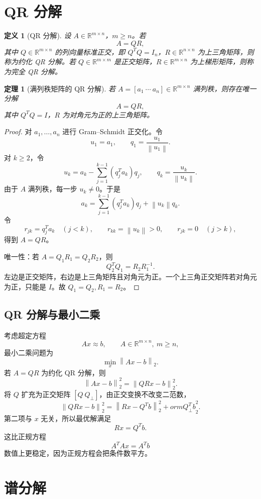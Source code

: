 \documentclass[UTF8,openany,zihao=-4]{ctexbook}
\theoremstyle{cnplain}
\newtheorem{definition}{定义}[chapter]
\newtheorem{theorem}{定理}[chapter]
\newcommand{\R}{\mathbb R}
\newcommand{\norm}[1]{\left\lVert #1\right\rVert}
\begin{document}
\section{QR 分解}

\begin{definition}[QR 分解]
设 $A\in\R^{m\times n}$，$m\ge n$。若
\[
A=QR,
\]
其中 $Q\in\R^{m\times n}$ 的列向量标准正交，即 $Q^TQ=I_n$，$R\in\R^{n\times n}$ 为上三角矩阵，则称为约化 QR 分解。若 $Q\in\R^{m\times m}$ 是正交矩阵，$R\in\R^{m\times n}$ 为上梯形矩阵，则称为完全 QR 分解。
\end{definition}

\begin{theorem}[满列秩矩阵的 QR 分解]
若 $A=[a_1\ \cdots\ a_n]\in\R^{m\times n}$ 满列秩，则存在唯一分解
\[
A=QR,
\]
其中 $Q^TQ=I$，$R$ 为对角元为正的上三角矩阵。
\end{theorem}

\begin{proof}
对 $a_1,
\ldots,a_n$ 进行 Gram--Schmidt 正交化。令
\[
u_1=a_1,
\qquad
q_1=\frac{u_1}{\norm{u_1}}.
\]
对 $k\ge2$，令
\[
u_k=a_k-\sum_{j=1}^{k-1}(q_j^Ta_k)q_j,
\qquad
q_k=\frac{u_k}{\norm{u_k}}.
\]
由于 $A$ 满列秩，每一步 $u_k\ne0$。于是
\[
a_k=\sum_{j=1}^{k-1}(q_j^Ta_k)q_j+\norm{u_k}q_k.
\]
令
\[
r_{jk}=q_j^Ta_k\quad(j<k),
\qquad
r_{kk}=\norm{u_k}>0,
\qquad
r_{jk}=0\quad(j>k),
\]
得到 $A=QR$。

唯一性：若 $A=Q_1R_1=Q_2R_2$，则
\[
Q_2^TQ_1=R_2R_1^{-1}.
\]
左边是正交矩阵，右边是上三角矩阵且对角元为正。一个上三角正交矩阵若对角元为正，只能是 $I$。故 $Q_1=Q_2,R_1=R_2$。
\end{proof}

\subsection{QR 分解与最小二乘}

考虑超定方程
\[
Ax\approx b,
\qquad A\in\R^{m\times n},
\ m\ge n,
\]
最小二乘问题为
\[
\min_x\norm{Ax-b}_2.
\]
若 $A=QR$ 为约化 QR 分解，则
\[
\norm{Ax-b}_2^2
=\norm{QRx-b}_2^2.
\]
将 $Q$ 扩充为正交矩阵 $[Q\ Q_\perp]$，由正交变换不改变二范数，
\[
\norm{QRx-b}_2^2
=\norm{Rx-Q^Tb}_2^2+
orm{Q_\perp^Tb}_2^2.
\]
第二项与 $x$ 无关，所以最优解满足
\[
Rx=Q^Tb.
\]
这比正规方程
\[
A^TAx=A^Tb
\]
数值上更稳定，因为正规方程会把条件数平方。

\section{谱分解}
\end{document}

